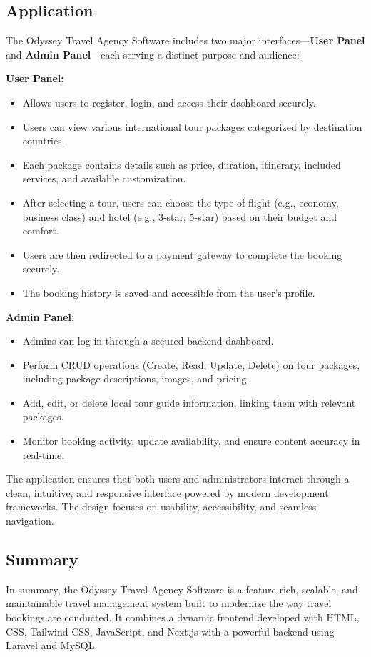 \subsection{Application}
The Odyssey Travel Agency Software includes two major interfaces—\textbf{User Panel} and \textbf{Admin Panel}—each serving a distinct purpose and audience:

\textbf{User Panel:}
\begin{itemize}
    \item Allows users to register, login, and access their dashboard securely.
    \item Users can view various international tour packages categorized by destination countries.
    \item Each package contains details such as price, duration, itinerary, included services, and available customization.
    \item After selecting a tour, users can choose the type of flight (e.g., economy, business class) and hotel (e.g., 3-star, 5-star) based on their budget and comfort.
    \item Users are then redirected to a payment gateway to complete the booking securely.
    \item The booking history is saved and accessible from the user’s profile.
\end{itemize}

\textbf{Admin Panel:}
\begin{itemize}
    \item Admins can log in through a secured backend dashboard.
    \item Perform CRUD operations (Create, Read, Update, Delete) on tour packages, including package descriptions, images, and pricing.
    \item Add, edit, or delete local tour guide information, linking them with relevant packages.
    \item Monitor booking activity, update availability, and ensure content accuracy in real-time.
\end{itemize}

The application ensures that both users and administrators interact through a clean, intuitive, and responsive interface powered by modern development frameworks. The design focuses on usability, accessibility, and seamless navigation.

\subsection{Summary}
In summary, the Odyssey Travel Agency Software is a feature-rich, scalable, and maintainable travel management system built to modernize the way travel bookings are conducted. It combines a dynamic frontend developed with HTML, CSS, Tailwind CSS, JavaScript, and Next.js with a powerful backend using Laravel and MySQL.


